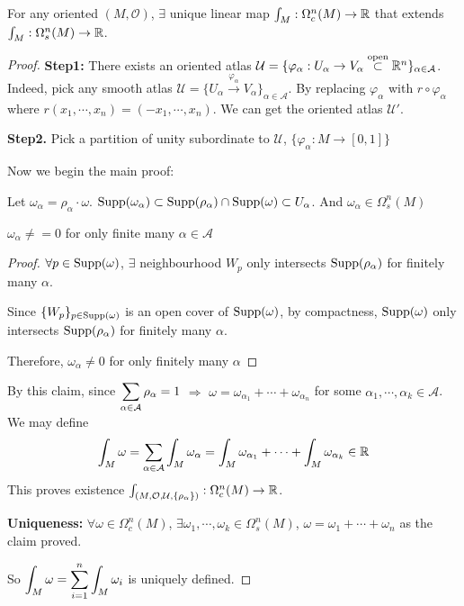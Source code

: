 \begin{theorem}
    For any oriented  $ (M,\mathcal{O}) $,  $ \exists $ unique linear map  $ \int_M:\Omega_c^n(M)\rightarrow\mathbb R $ that extends  $ \int_M:\Omega_s^n(M)\rightarrow \mathbb R $.   
\end{theorem}
\begin{proof}
    {\noindent\textbf{Step1:} There exists an oriented atlas  $ \mathcal{U}=\{\varphi_\alpha:U_\alpha\rightarrow V_\alpha\overset{\text{open}}{\subset}\mathbb R^n\}_{\alpha\in \mathcal{A}} $.
    }
    Indeed, pick any smooth atlas  $ \mathcal{U}=\{U_\alpha\xrightarrow{\varphi_\alpha} V_\alpha\}_{\alpha\in\mathcal{A}} $. By replacing  $ \varphi_\alpha $ with  $ r\circ \varphi_\alpha $ where  $ r(x_1,\cdots,x_n)=(-x_1,\cdots,x_n) $. We can get the oriented atlas  $ \mathcal{U}' $.
    
    {\noindent\textbf{Step2.} Pick a partition of unity subordinate to  $ \mathcal{U} $, $ \{\varphi_\alpha:M\rightarrow [0,1]\} $ }

    Now we begin the main proof:

    Let  $ \omega_\alpha=\rho_\alpha\cdot \omega $.  $ \mathrm{Supp}(\omega_\alpha)\subset \mathrm{Supp}(\rho_\alpha)\cap \mathrm{Supp}(\omega)\subset U_\alpha $. And  $ \omega_\alpha\in\Omega_s^n(M) $ 
    \begin{claim}
         $ \omega_\alpha\neq=0 $ for only finite many  $ \alpha\in\mathcal{A} $ 
    \end{claim}  
    \begin{proof}
         $ \forall p\in \mathrm{Supp}(\omega) $,  $ \exists $ neighbourhood $ W_p $ only intersects  $ \mathrm{Supp}(\rho_\alpha) $ for finitely many  $ \alpha $.
        
         Since  $ \{W_p\}_{p\in\mathrm{Supp}(\omega)} $ is an open cover of  $ \mathrm{Supp}(\omega) $, by compactness,  $ \mathrm{Supp}(\omega) $ only intersects  $ \mathrm{Supp}(\rho_\alpha) $ for finitely many  $ \alpha $.
         
        Therefore,  $ \omega_\alpha\neq0 $ for only finitely many  $ \alpha $  
    \end{proof}
    By this claim, since  $ \displaystyle\sum_{\alpha\in\mathcal{A}}\rho_\alpha=1 $ $ \Rightarrow $  $ \omega=\omega_{\alpha_1}+\cdots+\omega_{\alpha_n} $ for some  $ \alpha_1,\cdots,\alpha_k\in\mathcal{A} $.
    We may define 
    \begin{equation}
        \int_M\omega=\displaystyle\sum_{\alpha\in\mathcal{A}}\int_M\omega_\alpha=\int_M\omega_{\alpha_1}+\cdots+\int_M\omega_{\alpha_k}\in \mathbb R
    \end{equation}
    This proves existence  $ \int_{(M,\mathcal{O},\mathcal{U},\{\rho_\alpha\})}:\Omega_c^n(M)\rightarrow\mathbb R $.
    
    \textbf{Uniqueness:} $ \forall \omega\in \Omega_c^n(M) $,  $ \exists \omega_1,\cdots,\omega_k\in\Omega_s^n(M) $,  $ \omega=\omega_1+\cdots+\omega_n $ as the claim proved.
    
    So  $ \displaystyle\int_M\omega=\sum_{i=1}^n\int_M\omega_i $ is uniquely defined. 
\end{proof}
